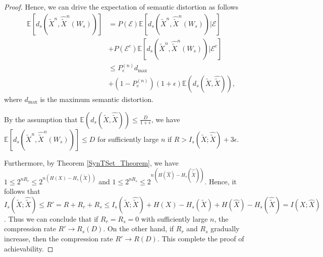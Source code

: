 \documentclass[12pt, draftclsnofoot,onecolumn]{IEEEtran}
\begin{document}
\begin{proof}
Hence, we can drive the expectation of semantic distortion as follows
\begin{equation}
\begin{aligned}
\mathbb{E}\left[d_s(\tilde{X}^n,\hat{\tilde{X}}^n(W_s))\right]&=P(\mathcal{E})\mathbb{E}\left[d_s(\tilde{X}^n,\hat{\tilde{X}}^n(W_s))|\mathcal{E}\right] \\
                                                                      &+P(\mathcal{E}^c)\mathbb{E}\left[d_s(\tilde{X}^n,\hat{\tilde{X}}^n(W_s))|\mathcal{E}^c\right]  \\
                                                                      &\leq P_e^{(n)}d_{\max}\\
                                                                      &+ (1-P_e^{(n)})(1+\epsilon) \mathbb{E} (d_s(\tilde{X},\hat{\tilde{X}})),
\end{aligned}
\end{equation}
where $d_{\max}$ is the maximum semantic distortion.

By the assumption that $\mathbb{E} (d_s(\tilde{X},\hat{\tilde{X}}))\leq \frac{D}{1+\epsilon}$, we have $\mathbb{E}\left[d_s(\tilde{X}^n,\hat{\tilde{X}}^n(W_s))\right]\leq D$ for sufficiently large $n$ if $R>I_s(\tilde{X};\hat{\tilde{X}})+3\epsilon$.

Furthermore, by Theorem \ref{SynTSet_Theorem}, we have $1\leq 2^{nR_r}\leq 2^{n(H(X)-H_s(\tilde{X}))}$ and $1\leq 2^{nR_s}\leq 2^{n(H(\hat{X})-H_s(\hat{\tilde{X}}))}$. Hence, it follows that $I_s(\tilde{X};\hat{\tilde{X}}) \leq R'=R+R_r+R_s \leq I_s(\tilde{X};\hat{\tilde{X}})+H(X)-H_s(\tilde{X})+H(\hat{X})-H_s(\hat{\tilde{X}})=I(X;\hat{X})$. Thus we can conclude that if $R_r=R_s=0$ with sufficiently large $n$, the compression rate $R'\to R_s(D)$. On the other hand, if $R_r$ and $R_s$ gradually increase, then the compression rate $R'\to R(D)$. This complete the proof of achievability.
\end{proof}
\end{document}
